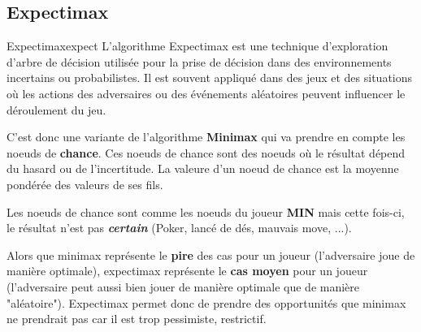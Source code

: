 
\subsection{Expectimax} %
\label{sub:expectimax}

\begin{definition}{Expectimax}{expect}
    L'algorithme Expectimax est une technique d'exploration d'arbre de décision utilisée pour la prise 
    de décision dans des environnements incertains ou probabilistes. Il est souvent appliqué dans 
    des jeux et des situations où les actions des adversaires ou des événements aléatoires peuvent influencer le déroulement du jeu.
\end{definition}

C'est donc une variante de l'algorithme \textbf{Minimax} qui va prendre en compte les noeuds de \textbf{chance}. 
Ces noeuds de chance sont des noeuds où le résultat dépend du hasard ou de l'incertitude.
La valeure d'un noeud de chance est la moyenne pondérée des valeurs de ses fils.

\begin{remark}\leavevmode
    Les noeuds de chance sont comme les noeuds du joueur \textbf{MIN} mais cette fois-ci, 
    le résultat n'est pas \textbf{\textit{certain}} (Poker, lancé de dés, mauvais move, ...).
\end{remark}

\begin{note}
    Alors que minimax représente le \textbf{pire} des cas pour un joueur (l'adversaire joue de manière optimale), 
    expectimax représente le \textbf{cas moyen} pour un joueur (l'adversaire peut aussi bien jouer de manière optimale que de manière "aléatoire").
    Expectimax permet donc de prendre des opportunités que minimax ne prendrait pas car il est trop pessimiste, restrictif.
\end{note}

